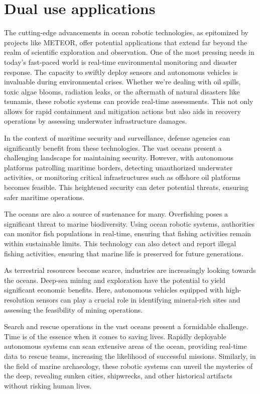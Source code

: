 \section{Dual use applications}
\label{sec:applications}
The cutting-edge advancements in ocean robotic technologies, as epitomized by projects like METEOR, offer potential applications that extend far beyond the realm of scientific exploration and observation. One of the most pressing needs in today's fast-paced world is real-time environmental monitoring and disaster response. The capacity to swiftly deploy sensors and autonomous vehicles is invaluable during environmental crises. Whether we're dealing with oil spills, toxic algae blooms, radiation leaks, or the aftermath of natural disasters like tsunamis, these robotic systems can provide real-time assessments. This not only allows for rapid containment and mitigation actions but also aids in recovery operations by assessing underwater infrastructure damages.

In the context of maritime security and surveillance, defense agencies can significantly benefit from these technologies. The vast oceans present a challenging landscape for maintaining security. However, with autonomous platforms patrolling maritime borders, detecting unauthorized underwater activities, or monitoring critical infrastructures such as offshore oil platforms becomes feasible. This heightened security can deter potential threats, ensuring safer maritime operations.

The oceans are also a source of sustenance for many. Overfishing poses a significant threat to marine biodiversity. Using ocean robotic systems, authorities can monitor fish populations in real-time, ensuring that fishing activities remain within sustainable limits. This technology can also detect and report illegal fishing activities, ensuring that marine life is preserved for future generations.

As terrestrial resources become scarce, industries are increasingly looking towards the oceans. Deep-sea mining and exploration have the potential to yield significant economic benefits. Here, autonomous vehicles equipped with high-resolution sensors can play a crucial role in identifying mineral-rich sites and assessing the feasibility of mining operations.

Search and rescue operations in the vast oceans present a formidable challenge. Time is of the essence when it comes to saving lives. Rapidly deployable autonomous systems can scan extensive areas of the ocean, providing real-time data to rescue teams, increasing the likelihood of successful missions. Similarly, in the field of marine archaeology, these robotic systems can unveil the mysteries of the deep, revealing sunken cities, shipwrecks, and other historical artifacts without risking human lives.

